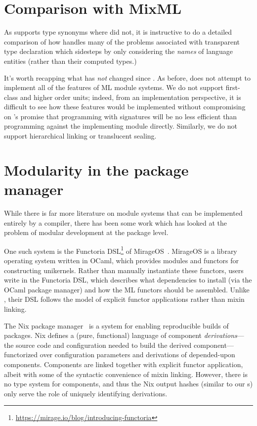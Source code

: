 \section{Comparison with MixML}

As \Backpack{} supports type synonyms where \OldBackpack{} did not,
it is instructive to do a detailed comparison of how \Backpack{} handles
many of the problems associated with transparent type declaration
which \OldBackpack{} sidesteps by only considering the \emph{names}
of language entities (rather than their computed types.)

It's worth recapping what has \emph{not} changed since \OldBackpack{}.
As before, \Backpack{} does not attempt to implement all of the features
of ML module systems.  We do not support first-class and higher order
units; indeed, from an implementation perspective, it is difficult to
see how these features would be implemented without compromising on
\Backpack{}'s promise that programming with signatures will be no less
efficient than programming against the implementing module directly.
Similarly, we do not support hierarchical linking or translucent
sealing.

\section{Modularity in the package manager}

While there is far more
literature on module systems that can be implemented entirely by a
compiler, there has been some work which has looked at the problem of
modular development at the package level.

One such system
is the Functoria DSL\footnote{\smaller\url{https://mirage.io/blog/introducing-functoria}}
of MirageOS~\cite{mirageos}.  MirageOS is a library operating system
written in OCaml, which provides modules and functors for constructing
unikernels.  Rather than manually instantiate these functors,
users write in the Functoria DSL, which describes what
dependencies to install (via the OCaml package manager) and how the ML
functors should be assembled.  Unlike \Backpack{}, their DSL follows
the model of explicit functor applications rather than mixin linking.

The Nix package manager~\cite{dolstra:thesis} is a
system for enabling reproducible builds of packages. Nix defines a (pure, functional) language of component
\emph{derivations}---\ie{} the source code and configuration
needed to build the derived component---%
functorized over configuration parameters and derivations of
depended-upon components.  Components are linked together with explicit
functor application, albeit with some of the syntactic convenience of
mixin linking.  However, there is no type system for components,
and thus the Nix output hashes (similar to our \cid{}s) only serve
the role of uniquely identifying derivations.

